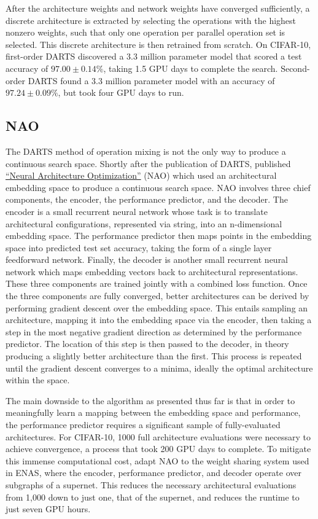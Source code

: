 After the architecture weights and network weights have converged sufficiently, a discrete architecture is extracted by
selecting the operations with the highest nonzero weights, such that only one operation per parallel operation set is
selected. This discrete architecture is then retrained from scratch. On CIFAR-10, first-order DARTS discovered a 3.3 million
parameter model that scored a test accuracy of $97.00\pm0.14\%$, taking 1.5 GPU days to complete the search. Second-order
DARTS found a 3.3 million parameter model with an accuracy of $97.24\pm0.09\%$, but took four GPU days to run.

\subsection{NAO}
The DARTS method of operation mixing is not the only way to produce a continuous search space. Shortly after the
publication of DARTS, \citeauthor{luo2019} published \hyperlink{cite.luo2019}{``Neural Architecture
Optimization''} (NAO) which used an architectural embedding space to produce a continuous search space.
NAO involves three chief components, the encoder, the performance predictor, and the decoder. The encoder is a small recurrent neural
network whose task is to translate architectural configurations, represented via string, into an n-dimensional embedding
space. The performance predictor then maps points in the embedding space into predicted test set accuracy, taking the form
of a single layer feedforward network. Finally, the decoder is another small recurrent neural network which maps embedding
vectors back to architectural representations. These three components are trained jointly with a combined loss function.
Once the three components are fully converged, better architectures can be derived by performing gradient descent over
the embedding space. This entails sampling an architecture, mapping it into the embedding space via the encoder, then
taking a step in the most negative gradient direction as determined by the performance predictor. The location of this step
is then passed to the decoder, in theory producing a slightly better architecture than the first. This process is repeated
until the gradient descent converges to a minima, ideally the optimal architecture within the space.

The main downside to the algorithm as presented thus far is that in order to meaningfully learn a mapping between
the embedding space and performance, the performance predictor requires a significant sample of fully-evaluated architectures.
For CIFAR-10, 1000 full architecture evaluations were necessary to achieve convergence, a process that took 200 GPU days to complete.
To mitigate this immense computational cost, \citeauthor{luo2019} adapt NAO to the weight sharing system used in ENAS, where the encoder,
performance predictor, and decoder operate over subgraphs of a supernet. This reduces the necessary architectural evaluations
from 1,000 down to just one, that of the supernet, and reduces the runtime to just seven GPU hours.

